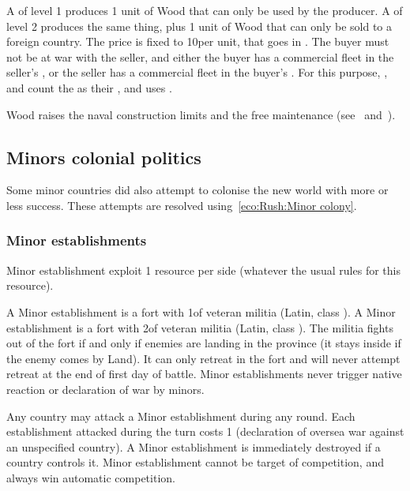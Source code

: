 A  \MNU of level 1 produces 1 unit of Wood
that can only be used by the producer. A  \MNU of level 2 produces
the same thing, plus 1 unit of Wood that can only be sold to a foreign
country.
\bparag The price is fixed to 10\ducats per unit, that goes in
.
\bparag The buyer must not be at war with the seller, and either the buyer has
a commercial fleet in the seller's \CTZ, or the seller has a commercial fleet
in the buyer's \CTZ.
\bparag For this purpose, \PRU, \POL and \SUE count the  as
their \CTZ, and \POR uses .

 Wood raises the naval construction limits and the free
maintenance (see~
and~).



\subsection{Minors colonial politics}

\aparag Some minor countries did also attempt to colonise the new world with
more or less success.
\bparag These attempts are resolved using~\ref{eco:Rush:Minor colony}.


\subsubsection{Minor establishments}
\aparag[Effects] Minor establishment exploit 1 resource per side (whatever the
usual rules for this resource).

\aparag[Military] A Minor establishment \Facemoins is a fort with 1\LDE of
veteran militia (Latin, class \CAIII).
\bparag A Minor establishment \Faceplus is a fort with 2\LDE of veteran
militia (Latin, class \CAIII).
\bparag The militia fights out of the fort if and only if enemies are landing
in the province (it stays inside if the enemy comes by Land). It can only
retreat in the fort and will never attempt retreat at the end of first day of
battle.
\bparag Minor establishments never trigger native reaction or declaration of
war by \ROTW minors.

\aparag[Destruction] Any country may attack a Minor establishment during any
round.
\bparag Each establishment attacked during the turn costs 1 \STAB (declaration
of oversea war against an unspecified country).
\bparag A Minor establishment is immediately destroyed if a country controls
it.
\bparag Minor establishment cannot be target of competition, and always win
automatic competition.


